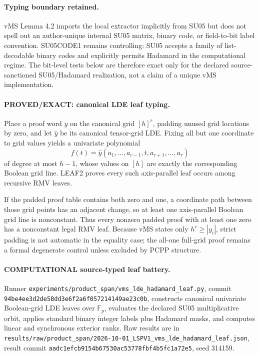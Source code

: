 \documentclass[11pt]{article}
\begin{document}
\paragraph{Typing boundary retained.}
vMS Lemma 4.2 imports the local extractor implicitly from SU05 but does not spell out an author-unique internal SU05 matrix, binary code, or field-to-bit label convention. SU05CODE1 remains controlling: SU05 accepts a family of list-decodable binary codes and explicitly permits Hadamard in the computational regime. The bit-level tests below are therefore exact only for the declared source-sanctioned SU05/Hadamard realization, not a claim of a unique vMS implementation.

\paragraph{PROVED/EXACT: canonical LDE leaf typing.}
Place a proof word $y$ on the canonical grid $[h]^r$, padding unused grid locations by zero, and let $\widehat y$ be its canonical tensor-grid LDE. Fixing all but one coordinate to grid values yields a univariate polynomial
\[
f(t)=\widehat y(a_1,\ldots,a_{c-1},t,a_{c+1},\ldots,a_r)
\]
of degree at most $h-1$, whose values on $[h]$ are exactly the corresponding Boolean grid line. LEAF2 proves every such axis-parallel leaf occurs among recursive RMV leaves.

If the padded proof table contains both zero and one, a coordinate path between those grid points has an adjacent change, so at least one axis-parallel Boolean grid line is nonconstant. Thus every nonzero padded proof with at least one zero has a nonconstant legal RMV leaf. Because vMS states only $h^r\ge |y_i|$, strict padding is not automatic in the equality case; the all-one full-grid proof remains a formal degenerate control unless excluded by PCPP structure.

\paragraph{COMPUTATIONAL source-typed leaf battery.}
Runner \texttt{experiments/product_span/vms_lde_hadamard_leaf.py}, commit \texttt{94be4ee3d2de58dd3e6f2a6f057214149ae23c0b}, constructs canonical univariate Boolean-grid LDE leaves over $\mathbb F_p$, evaluates the declared SU05 multiplicative orbit, applies standard binary integer labels plus Hadamard masks, and computes linear and synchronous exterior ranks. Raw results are in \texttt{results/raw/product_span/2026-10-01_LSPV1_vms_lde_hadamard_leaf.json}, result commit \texttt{aadc1efcb9154b67530ac53778fbf4b5fc1a72e5}, seed 314159.
\end{document}
